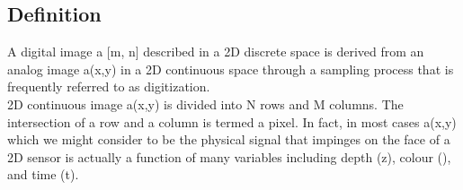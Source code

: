 
\subsection{Definition}\label{subsec:definition}
A digital image a [m, n] described in a 2D discrete space is derived from an analog image a(x,y) in a 2D continuous space through a sampling process that is frequently referred to as digitization.\\
2D continuous image a(x,y) is divided into N rows and M columns.
The intersection of a row and a column is termed a pixel.
In fact, in most cases a(x,y) which we might consider to be the physical signal that impinges on the face of a 2D sensor is actually a function of many variables including depth (z), colour (\lambda), and time (t).